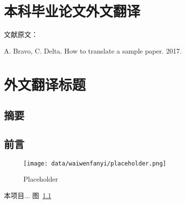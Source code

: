 {
\renewcommand{\baselinestretch}{1.25}\selectfont

{
  \titleformat{\chapter}[block]{\erhao\songti\bfseries\filcenter}{}{0em}{}{}
  \chapter{本科毕业论文外文翻译}
}

{
  \setlength{\parindent}{0em}

  文献原文：

  A. Bravo, C. Delta. How to translate a sample paper. 2017. \par
}

\vspace{2em}

{
  \renewcommand{\cleardoublepage}{}
  \renewcommand{\clearpage}{}
  \titleformat{\chapter}[block]{\sanhao\songti\bfseries\filcenter}{}{0em}{}{}
  \chapter*{外文翻译标题}
}

\section*{摘要}

\section{前言}

\begin{figure}[!htbp]
\centering
\texttt{[image: data/waiwenfanyi/placeholder.png]}
\caption{Placeholder}
\label{figure:placeholder}
\end{figure}

本项目\cite{article1}...
图~\ref{figure:placeholder}



{
\renewcommand{\chapter}[2]{\section*{#2}\addcontentsline{toc}{section}{#2}}

}


}


